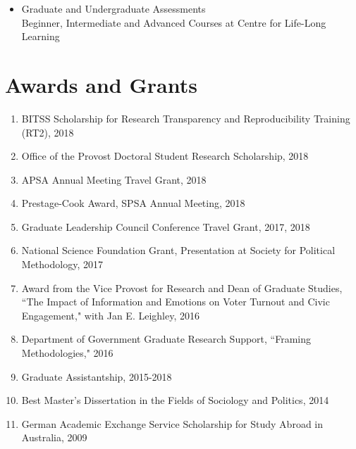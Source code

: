 \documentclass[10pt]{article}
\begin{document}
\begin{flushleft}
\begin{itemize}
\item[] Graduate and Undergraduate Assessments \\
Beginner, Intermediate and Advanced Courses at Centre for Life-Long Learning
\end{itemize}



\section*{Awards and Grants}

\begin{enumerate}[leftmargin=!,labelindent=20pt,itemindent=-20pt]
\item[] BITSS Scholarship for Research Transparency and Reproducibility Training (RT2), 2018 
\vspace{-0.27cm}
\item[] Office of the Provost Doctoral Student Research Scholarship, 2018
\vspace{-0.27cm}
\item[] APSA Annual Meeting Travel Grant, 2018
\vspace{-0.27cm}
\item[] Prestage-Cook Award, SPSA Annual Meeting, 2018
\vspace{-0.27cm}
\item[] Graduate Leadership Council Conference Travel Grant, 2017, 2018
\vspace{-0.27cm}
\item[] National Science Foundation Grant, Presentation at Society for Political Methodology, 2017
\vspace{-0.27cm}
\item[] Award from the Vice Provost for Research and Dean of Graduate Studies, ``The Impact of Information and Emotions on Voter Turnout and Civic Engagement," with Jan E. Leighley, 2016
\vspace{-0.27cm}
\item[] Department of Government Graduate Research Support, ``Framing Methodologies," 2016
\vspace{-0.27cm}
\item[] Graduate Assistantship, 2015-2018
\vspace{-0.27cm}
\item[] Best Master's Dissertation in the Fields of Sociology and Politics, 2014
\vspace{-0.27cm}
\item [] German Academic Exchange Service Scholarship for Study Abroad in Australia, 2009
\end{enumerate}





\end{flushleft}
\end{document}
